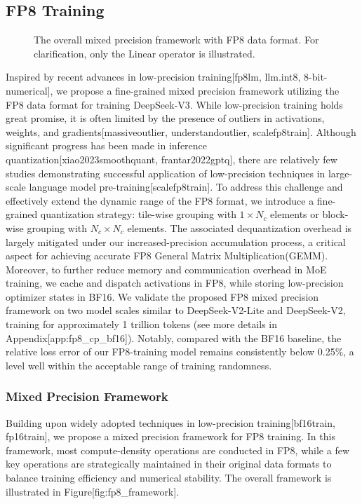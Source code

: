 \documentclass[11pt,a4paper]{article}
\begin{document}
\subsection{FP8 Training}

\begin{figure}[h]
\caption{The overall mixed precision framework with FP8 data format. For clarification, only the Linear operator is illustrated.}
\end{figure}

Inspired by recent advances in low-precision training[fp8lm, llm.int8, 8-bit-numerical], we propose a fine-grained mixed precision framework utilizing the FP8 data format for training DeepSeek-V3. While low-precision training holds great promise, it is often limited by the presence of outliers in activations, weights, and gradients[massiveoutlier, understandoutlier, scalefp8train]. Although significant progress has been made in inference quantization[xiao2023smoothquant, frantar2022gptq], there are relatively few studies demonstrating successful application of low-precision techniques in large-scale language model pre-training[scalefp8train]. To address this challenge and effectively extend the dynamic range of the FP8 format, we introduce a fine-grained quantization strategy: tile-wise grouping with $1\times N_c$ elements or block-wise grouping with $N_c\times N_c$ elements. The associated dequantization overhead is largely mitigated under our increased-precision accumulation process, a critical aspect for achieving accurate FP8 General Matrix Multiplication(GEMM). Moreover, to further reduce memory and communication overhead in MoE training, we cache and dispatch activations in FP8, while storing low-precision optimizer states in BF16. We validate the proposed FP8 mixed precision framework on two model scales similar to DeepSeek-V2-Lite and DeepSeek-V2, training for approximately 1 trillion tokens (see more details in Appendix[app:fp8\_cp\_bf16]). Notably, compared with the BF16 baseline, the relative loss error of our FP8-training model remains consistently below 0.25\%, a level well within the acceptable range of training randomness.

\subsubsection{Mixed Precision Framework}

Building upon widely adopted techniques in low-precision training[bf16train, fp16train], we propose a mixed precision framework for FP8 training. In this framework, most compute-density operations are conducted in FP8, while a few key operations are strategically maintained in their original data formats to balance training efficiency and numerical stability. The overall framework is illustrated in Figure[fig:fp8\_framework].
\end{document}
